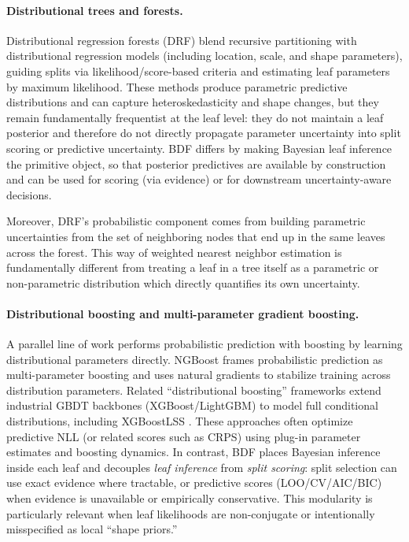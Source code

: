 \documentclass[twoside,11pt]{article}
\begin{document}
\paragraph{Distributional trees and forests.}
Distributional regression forests (DRF) \citep{schlosser2019distributional} blend recursive partitioning with distributional regression models (including location, scale, and shape parameters), guiding splits via likelihood/score-based criteria and estimating leaf parameters by maximum likelihood. These methods produce parametric predictive distributions and can capture heteroskedasticity and shape changes, but they remain fundamentally frequentist at the leaf level: they do not maintain a leaf posterior and therefore do not directly propagate parameter uncertainty into split scoring or predictive uncertainty. BDF differs by making Bayesian leaf inference the primitive object, so that posterior predictives are available by construction and can be used for scoring (via evidence) or for downstream uncertainty-aware decisions.

Moreover, DRF's probabilistic component comes from building parametric uncertainties from the set of neighboring nodes that end up in the same leaves across the forest. This way of weighted nearest neighbor estimation is fundamentally different from treating a leaf in a tree itself
as a parametric or non-parametric distribution which directly quantifies its own uncertainty.

\paragraph{Distributional boosting and multi-parameter gradient boosting.}
A parallel line of work performs probabilistic prediction with boosting by learning distributional parameters directly. NGBoost \citep{duan2020ngboost} frames probabilistic prediction as multi-parameter boosting and uses natural gradients to stabilize training across distribution parameters. Related ``distributional boosting'' frameworks extend industrial GBDT backbones (XGBoost/LightGBM) to model full conditional distributions, including XGBoostLSS \citep{marz2019xgboostlss}. These approaches often optimize predictive NLL (or related scores such as CRPS) using plug-in parameter estimates and boosting dynamics. In contrast, BDF places Bayesian inference inside each leaf and decouples \emph{leaf inference} from \emph{split scoring}: split selection can use exact evidence where tractable, or predictive scores (LOO/CV/AIC/BIC) when evidence is unavailable or empirically conservative.
This modularity is particularly relevant when leaf likelihoods are non-conjugate or intentionally misspecified as local ``shape priors.''
\end{document}
